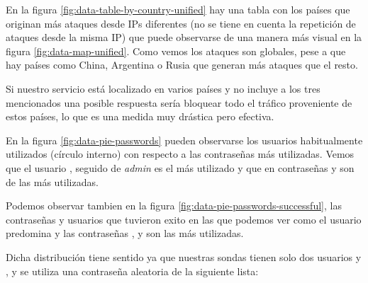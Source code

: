 En la figura \ref{fig:data-table-by-country-unified} hay una tabla con los países que originan más ataques desde IPs diferentes (no se tiene en cuenta 
la repetición de ataques desde la misma IP) que puede observarse de una manera más visual en la figura \ref{fig:data-map-unified}. Como vemos los ataques son globales,
pese a que hay países como China, Argentina o Rusia que generan más ataques que el resto.

Si nuestro servicio está localizado en varios países y no incluye a los tres mencionados una posible respuesta sería bloquear todo el tráfico proveniente
de estos países, lo que es una medida muy drástica pero efectiva. 

En la figura \ref{fig:data-pie-passwords} pueden observarse los usuarios habitualmente utilizados (círculo interno) con respecto
a las contraseñas más utilizadas. Vemos que el usuario , seguido de \emph{admin} es el más utilizado y que en contraseñas
 y  son de las más utilizadas.

Podemos observar tambien en la figura \ref{fig:data-pie-passwords-successful}, las contraseñas y usuarios que tuvieron exito en las que podemos ver
como el usuario  predomina y las contraseñas ,  y  son las más utilizadas.

Dicha distribución tiene sentido ya que nuestras sondas tienen solo dos usuarios  y , y se utiliza una contraseña aleatoria 
de la siguiente lista:

